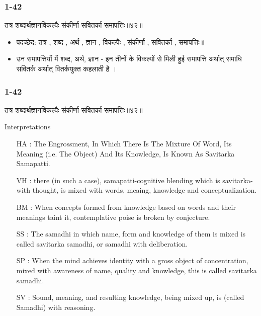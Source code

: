 \begin{frame}[fragile]\frametitle{1-42}
\begin{sanskrit}
तत्र शब्दार्थज्ञानविकल्पैः संकीर्णा सवितर्का समापत्तिः॥४२॥
\end{sanskrit}

\begin{itemize}
\item पदच्छेद: तत्र , शब्द , अर्थ , ज्ञान , विकल्पैः , संकीर्णा , सवितर्का , समापत्तिः॥
\item उन समापत्तियों में शब्द, अर्थ, ज्ञान - इन तीनों के विकल्पों से मिली हुई समापत्ति अर्थात् समाधि सवितर्क अर्थात् वितर्कयुक्त कहलाती है ।
\end{itemize}

\end{frame}


\begin{frame}[fragile]\frametitle{1-42}
\begin{sanskrit}
तत्र शब्दार्थज्ञानविकल्पैः संकीर्णा सवितर्का समापत्तिः॥४२॥
\end{sanskrit}

Interpretations
\begin{itemize}
\item [HA]: The Engrossment, In Which There Is The Mixture Of Word, Its Meaning (i.e. The Object) And Its Knowledge, Is Known As Savitarka Samapatti.
\item [VH]: there (in such a case), samapatti-cognitive blending which is savitarka-with thought, is mixed with words, meaing, knowledge and conceptualization.
\item [BM]: When concepts formed from knowledge based on words and their meanings taint it, contemplative poise is broken by conjecture.
\item [SS]: The samadhi in which name, form and knowledge of them is mixed is called savitarka samadhi, or samadhi with deliberation.
\item [SP]: When the mind achieves identity with a gross object of concentration, mixed with awareness of name, quality and knowledge, this is called savitarka samadhi.
\item [SV]: Sound, meaning, and resulting knowledge, being mixed up, is (called Samadhi) with reasoning.
\end{itemize}
	
\end{frame}


